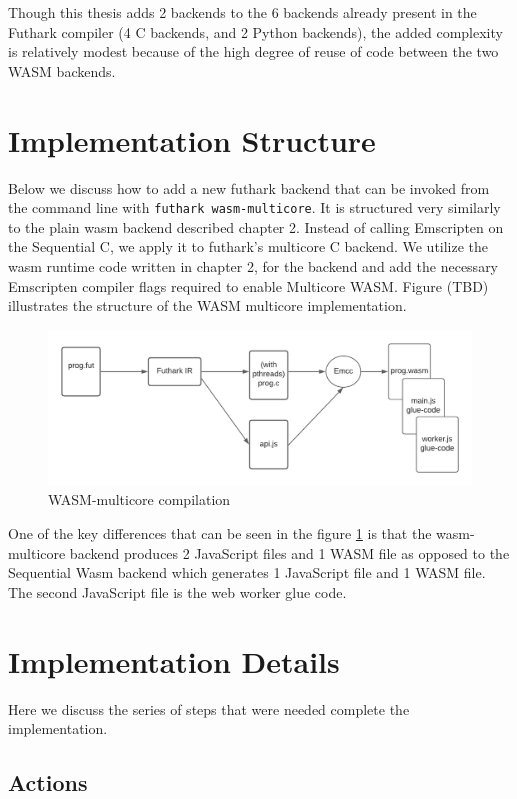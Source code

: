 \documentclass[11pt]{book}
\begin{document}
Though this thesis adds 2 backends to the 6 backends already present in the Futhark compiler (4 C backends, and 2 Python backends), the added complexity is relatively modest because of the high degree of reuse of code between the two WASM backends. 


\section{Implementation Structure}

Below we discuss how to add a new futhark backend that can be invoked from the command line with \texttt{futhark wasm-multicore}. It is structured very similarly to the plain wasm backend described chapter 2. Instead of calling Emscripten on the Sequential C, we apply it to futhark's multicore C backend. We utilize the wasm runtime code written in chapter 2, for the backend and add the necessary Emscripten compiler flags required to enable Multicore WASM. Figure (TBD) illustrates the structure of the WASM multicore implementation.

\begin{figure}[htbp]
\centerline{\includegraphics[width=\textwidth]{figures/WASM_MC_compiler.png}}
    \caption{WASM-multicore compilation}
\label{fig:wasm-mc}
\end{figure}
One of the key differences that can be seen in the figure \ref{fig:wasm-mc} is that the wasm-multicore backend produces 2 JavaScript files and 1 WASM file as opposed to the Sequential Wasm backend which generates 1 JavaScript file and 1 WASM file. The second JavaScript file is the web worker glue code.

\section{Implementation Details}
Here we discuss the series of steps that were needed complete the implementation.
\subsection{Actions}
\end{document}
